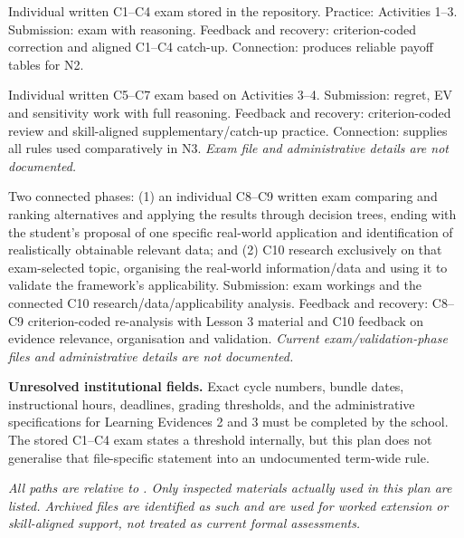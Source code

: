 \documentclass[10pt,letterpaper]{article}
\newcommand{\plansection}[1]{\Needspace{8\baselineskip}\par\vspace{8pt}{\large\bfseries #1\par}\vspace{3pt}}
\newcommand{\sourcefile}{\path}
\begin{document}
\begin{description}[leftmargin=1.55in,style=nextline,itemsep=5pt]
\item[First Learning Evidence] Individual written C1--C4 exam stored in the repository. Practice: Activities 1--3. Submission: exam with reasoning. Feedback and recovery: criterion-coded correction and aligned C1--C4 catch-up. Connection: produces reliable payoff tables for N2.
\item[Second Learning Evidence] Individual written C5--C7 exam based on Activities 3--4. Submission: regret, EV and sensitivity work with full reasoning. Feedback and recovery: criterion-coded review and skill-aligned supplementary/catch-up practice. Connection: supplies all rules used comparatively in N3. \textit{Exam file and administrative details are not documented.}
\item[Third Learning Evidence] Two connected phases: (1) an individual C8--C9 written exam comparing and ranking alternatives and applying the results through decision trees, ending with the student's proposal of one specific real-world application and identification of realistically obtainable relevant data; and (2) C10 research exclusively on that exam-selected topic, organising the real-world information/data and using it to validate the framework's applicability. Submission: exam workings and the connected C10 research/data/applicability analysis. Feedback and recovery: C8--C9 criterion-coded re-analysis with Lesson 3 material and C10 feedback on evidence relevance, organisation and validation. \textit{Current exam/validation-phase files and administrative details are not documented.}
\end{description}

\textbf{Unresolved institutional fields.} Exact cycle numbers, bundle dates,
instructional hours, deadlines, grading thresholds, and the administrative
specifications for Learning Evidences 2 and 3 must be completed by the school.
The stored C1--C4 exam states a threshold internally, but this plan does not
generalise that file-specific statement into an undocumented term-wide rule.

\plansection{References}

\textit{All paths are relative to \sourcefile{book2026-2027/grade10/term_1/}.
Only inspected materials actually used in this plan are listed. Archived files
are identified as such and are used for worked extension or skill-aligned
support, not treated as current formal assessments.}
\end{document}
